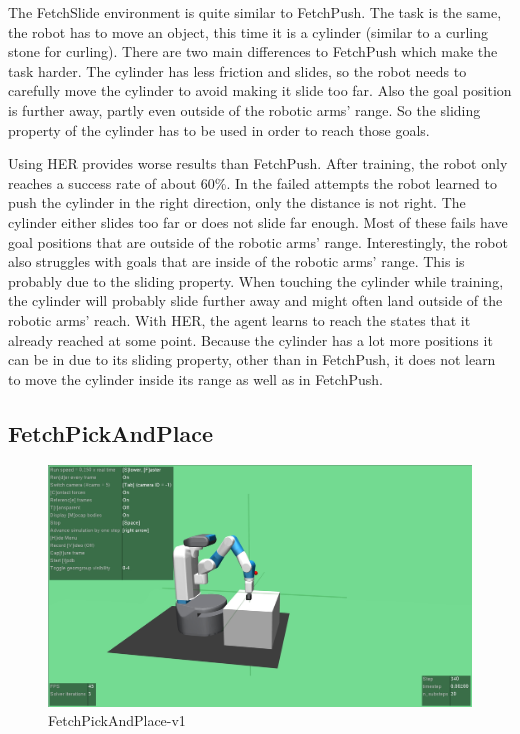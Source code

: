 The FetchSlide environment is quite similar to FetchPush. The task is the same, the robot has to move an object, this time it is a cylinder (similar to a curling stone for curling). There are two main differences to FetchPush which make the task harder. The cylinder has less friction and slides, so the robot needs to carefully move the cylinder to avoid making it slide too far. Also the goal position is further away, partly even outside of the robotic arms' range. So the sliding property of the cylinder has to be used in order to reach those goals. 

\vspace{0.5cm}

Using HER provides worse results than FetchPush. After training, the robot only reaches a success rate of about 60\%. 
In the failed attempts the robot learned to push the cylinder in the right direction, only the distance is not right. The cylinder either slides too far or does not slide far enough. Most of these fails have goal positions that are outside of the robotic arms' range. Interestingly, the robot also struggles with goals that are inside of the robotic arms' range. This is probably due to the sliding property. When touching the cylinder while training, the cylinder will probably slide further away and might often land outside of the robotic arms' reach. With HER, the agent learns to reach the states that it already reached at some point. Because the cylinder has a lot more positions it can be in due to its sliding property, other than in FetchPush, it does not learn to move the cylinder inside its range as well as in FetchPush.    

\subsection{FetchPickAndPlace}

\begin{figure} [h]
	
	\centering
	\includegraphics[width=1\textwidth]{figures/FetchPickAndPlace-v1.png}
	\caption{FetchPickAndPlace-v1}
	\label{pickplace2}
\end{figure}

